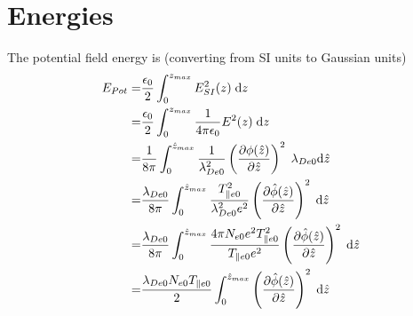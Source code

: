 \documentclass[final]{jpp}
\begin{document}
\section{Energies}
The potential field energy is (converting from SI units to Gaussian units)
\begin{align}
    E_{Pot} =& \frac{\epsilon_0}{2}\int_0^{z_{max}} E_{SI}^2(z)\; {\rm d}z \nonumber \\
    =& \frac{\epsilon_0}{2}\int_0^{z_{max}} \frac{1}{4\pi\epsilon_0} E^2(z)\; {\rm d}z \nonumber \\
    =& \frac{1}{8\pi}\int_0^{\hat{z}_{max}} \frac{1}{\lambda_{De0}^2} \left(\frac{\partial \phi(\hat{z})}{\partial \hat{z}} \right)^2 \; \lambda_{De0}{\rm d}\hat{z} \nonumber \\
    =& \frac{\lambda_{De0}}{8\pi}\int_0^{\hat{z}_{max}} \frac{T_{\parallel e0}^2}{\lambda_{De0}^2e^2} \left(\frac{\partial \hat{\phi}(\hat{z})}{\partial \hat{z}} \right)^2 \; {\rm d}\hat{z} \nonumber \\
    =& \frac{\lambda_{De0}}{8\pi}\int_0^{\hat{z}_{max}} \frac{4\pi N_{e0} e^2 T_{\parallel e0}^2}{T_{\parallel e0}e^2} \left(\frac{\partial \hat{\phi}(\hat{z})}{\partial \hat{z}} \right)^2 \; {\rm d}\hat{z} \nonumber \\
    =& \frac{\lambda_{De0}N_{e0}T_{\parallel e0}}{2}\int_0^{\hat{z}_{max}} \left(\frac{\partial \hat{\phi}(\hat{z})}{\partial \hat{z}} \right)^2 \; {\rm d}\hat{z}
\end{align}
\end{document}
